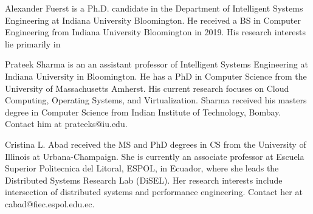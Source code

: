

\begin{IEEEbiography}
{Alexander Fuerst} is a Ph.D. candidate in the Department of Intelligent Systems Engineering at Indiana University Bloomington. He received a BS in Computer Engineering from Indiana University Bloomington in 2019.  His research interests lie primarily in \end{IEEEbiography}


\begin{IEEEbiography}{Prateek Sharma}
  is an an assistant professor of Intelligent Systems Engineering at Indiana University in Bloomington. He has a PhD in Computer Science from  
the University of Massachusetts Amherst. His current research
  focuses on Cloud Computing, Operating Systems, and
  Virtualization. Sharma received his masters degree in Computer Science from
  Indian Institute of Technology, Bombay. Contact him at
  prateeks@iu.edu.
\end{IEEEbiography}


\begin{IEEEbiography}{Cristina L. Abad} received the MS and PhD degrees in CS from the University of Illinois at Urbana-Champaign. She is currently an associate professor at Escuela Superior Politecnica del Litoral, ESPOL, in Ecuador, where she leads the Distributed Systems Research Lab (DiSEL). Her research interests include intersection of distributed systems and performance engineering. Contact her at cabad@fiec.espol.edu.ec.
\end{IEEEbiography}
